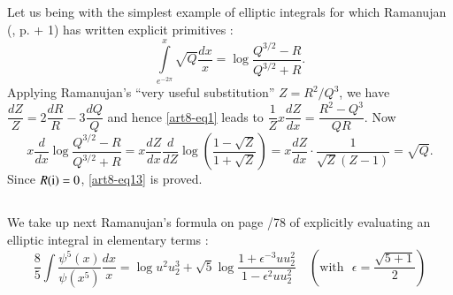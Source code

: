 \subsection{}\label{art8-sec2.1}
Let us being with the simplest example of elliptic integrals for which Ramanujan (\cite{art8-key11}, p.  + 1) has written explicit primitives :
\begin{equation}
\int\limits^{x}_{e^{-2\pi}}\sqrt{Q}\dfrac{dx}{x}=\log \frac{Q^{3/2}-R}{Q^{3/2}+R}.\label{art8-eq13}
\end{equation}
Applying Ramanujan's ``very useful substitution'' $Z=R^{2}/Q^{3}$, we have $\dfrac{dZ}{Z}=2\dfrac{dR}{R}-3\dfrac{dQ}{Q}$ and hence \eqref{art8-eq1} leads to $\dfrac{1}{Z}x\dfrac{dZ}{dx}=\dfrac{R^{2}-Q^{3}}{QR}$. Now 
$$
x\dfrac{d}{dx}\log \dfrac{Q^{3/2}-R}{Q^{3/2}+R}=x\dfrac{dZ}{dx}\dfrac{d}{dZ}\log\left(\dfrac{1-\sqrt{Z}}{1+\sqrt{Z}}\right)=x\dfrac{dZ}{dx}\cdot \dfrac{1}{\sqrt{Z}(Z-1)}=\sqrt{Q}.
$$\pageoriginale
Since $R{\rm(i)}=0$, \eqref{art8-eq13} is proved.

\subsection{}\label{art8-sec2.2}
We take up next Ramanujan's formula on page /78 of \cite{art8-key11} explicitly evaluating an elliptic integral in elementary terms :
\begin{equation}
\frac{8}{5}\int \frac{\psi^{5}(x)}{\psi(x^{5})}\dfrac{dx}{x}=\log u^{2}u^{3}_{2}+\sqrt{5}\log \frac{1+\epsilon^{-3}uu^{2}_{2}}{1-\epsilon^{2}uu^{2}_{2}}\quad \left(\text{with~ } \epsilon =\dfrac{\sqrt{5+1}}{2}\right)
\end{equation}


